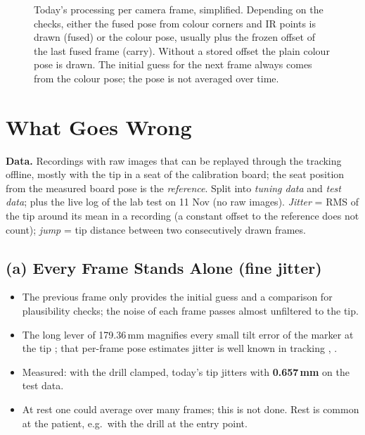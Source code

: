 \documentclass[11pt,a4paper,fleqn]{article}
\begin{document}
\begin{figure}[!htb]
\caption{Today's processing per camera frame, simplified. Depending on the checks, either the fused pose from colour
corners and IR points is drawn (fused) or the colour pose, usually plus the frozen offset of the last fused frame
(carry). Without a stored offset the plain colour pose is drawn. The initial guess for the next frame always comes
from the colour pose; the pose is not averaged over time.}
\label{fig:today}
\end{figure}

\section{What Goes Wrong}
\label{sec:problem}

\textbf{Data.} Recordings with raw images that can be replayed through the tracking offline, mostly with the tip in
a seat of the calibration board; the seat position from the measured board pose is the \emph{reference}. Split into
\emph{tuning data} and \emph{test data}; plus the live log of the lab test on 11 Nov (no raw images).
\emph{Jitter} = RMS of the tip around its mean in a recording (a constant offset to the reference does not count);
\emph{jump} = tip distance between two consecutively drawn frames.

\subsection*{(a) Every Frame Stands Alone \textnormal{(fine jitter)}}
\begin{itemize}
  \item The previous frame only provides the initial guess and a comparison for plausibility checks; the noise of
        each frame passes almost unfiltered to the tip.
  \item The long lever of 179.36\,mm magnifies every small tilt error of the marker at the tip
        \cite[pp.~535, 543]{west2004designing}; that per-frame pose estimates jitter is well known in tracking
        \cite[pp.~60--61, 72]{lepetit2005monocular}, \cite[Sec.~III.A]{vacchetti2004stable}.
  \item Measured: with the drill clamped, today's tip jitters with \textbf{0.657\,mm} on the test data.
  \item At rest one could average over many frames; this is not done. Rest is common at the patient, e.g.\ with the
        drill at the entry point.
\end{itemize}
\end{document}

